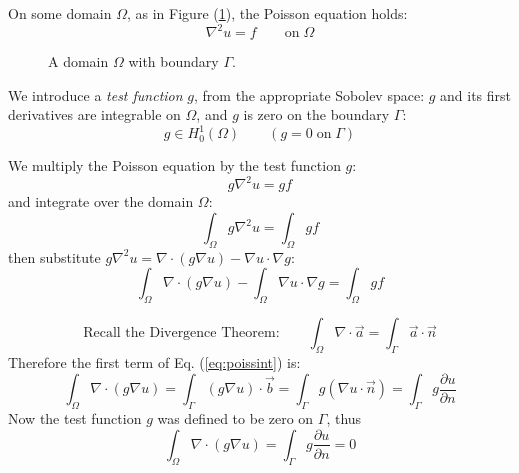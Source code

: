 \documentclass[12pt, a4paper, twoside, openright]{book}
\begin{document}
\vspace{2em}

On some domain $\Omega$, as in Figure (\ref{domain}), the Poisson equation holds:
\begin{equation}
\nabla^2 u = f \qquad \text{on} \; \Omega
\end{equation}

\vspace{1em}
\begin{figure}[ht]
\centering
{}
\caption{A domain $\Omega$ with boundary $\Gamma$.}\label{domain}
\end{figure}

\clearpage
We introduce a \emph{test function} $g$, from the appropriate Sobolev space:  $g$ and its first derivatives are integrable on $\Omega$, and $g$ is zero on the boundary $\Gamma$:
\begin{equation}
g \in H_0^1(\Omega) \qquad (g=0 \; \text{on} \; \Gamma)
\end{equation}

We multiply the Poisson equation by the test function $g$:
\begin{equation}
g \nabla^2 u = g f
\end{equation}
and integrate over the domain $\Omega$:
\begin{equation}
\int_{\Omega} g \nabla^2 u = \int_{\Omega} g f
\end{equation}
then substitute $g \nabla^2 u = \nabla \cdot (g \nabla u) - \nabla u \cdot \nabla g$:
\begin{equation}
\int_{\Omega} \nabla \cdot (g \nabla u) - \int_{\Omega} \nabla u \cdot \nabla g  
= \int_{\Omega} g f
\label{eq:poissint}
\end{equation}

\begin{equation}
\text{Recall the Divergence Theorem:} \qquad
\int_{\Omega} \nabla \cdot \vec{a}  = \int_{\Gamma} \vec{a} \cdot \vec{n}
\end{equation}
Therefore the first term of Eq. (\ref{eq:poissint}) is:
\begin{equation}
\int_{\Omega} \nabla \cdot (g \nabla u) = 
\int_{\Gamma} (g \nabla u) \cdot \vec{b} = \int_{\Gamma} g (\nabla u \cdot \vec{n})
= \int_{\Gamma} g \frac{\partial u}{\partial n}
\end{equation}
Now the test function $g$ was defined to be zero on $\Gamma$, thus
\begin{equation}
\int_{\Omega} \nabla \cdot (g \nabla u)
 = \int_{\Gamma} g \frac{\partial u}{\partial n} =0
\end{equation}
\end{document}
